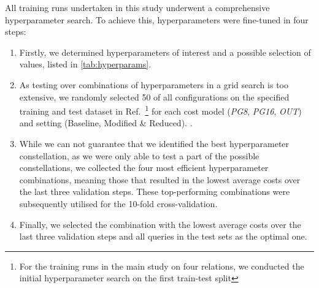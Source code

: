 \documentclass[10pt, conference]{IEEEtran}
\begin{document}
All training runs undertaken in this study underwent a comprehensive hyperparameter search.
To achieve this, hyperparameters were fine-tuned in four steps:
\begin{enumerate}
  \item Firstly, we determined hyperparameters of interest and a possible selection of values, listed in \autoref{tab:hyperparams}.
  \item As testing over  combinations of hyperparameters in a grid search is too extensive, we randomly selected 50 of all configurations on the specified training and test dataset in Ref.~\cite{marcus18}\footnote{For the training runs in the main study on four relations, we conducted the initial hyperparameter search on the first train-test split} for each cost model (\emph{PG8}, \emph{PG16}, \emph{OUT}) and setting (Baseline, Modified \& Reduced).
.
  \item  While we can not guarantee that we identified the best hyperparameter constellation, as we were only able to test a part of the possible constellations, we collected the four most efficient hyperparameter combinations, meaning those that resulted in the lowest average costs over the last three validation steps. These top-performing combinations were subsequently utilised for the 10-fold cross-validation.
  \item Finally, we selected the combination with the lowest average costs over the last three validation steps and all queries in the test sets as the optimal one.
\end{enumerate}
\end{document}
